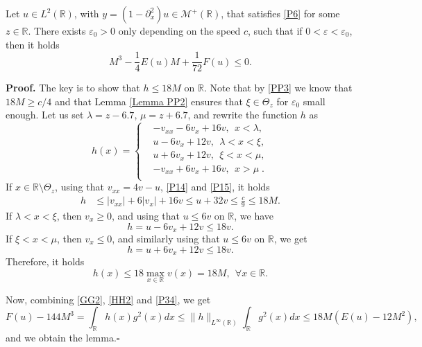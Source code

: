 \documentclass[10pt,a4paper,twoside]{article}
\begin{document}
\begin{Lem}\label{Lemma P6}
Let $u\in L^{2}(\mathbb{R})$, with  $y=(1-\partial^{2}_{x})u \in {\mathcal M}^+({\mathbb R})$, that satisfies  \eqref{P6} for some $z\in\mathbb{R}$. There exists $\varepsilon_{0}>0$ only depending on the speed $c$, such that if $0<\varepsilon<\varepsilon_{0}$, then it holds
\begin{equation}
M^{3}-\frac{1}{4}E(u)M+\frac{1}{72}F(u)\le 0.
\label{P33}
\end{equation}
\end{Lem}\noindent
\textbf{Proof.}
The key is to show that $h\le 18 M$ on $\mathbb{R}$. Note that by \eqref{PP3} we know that 
$18M\ge c/4$ and that Lemma \ref{Lemma PP2} ensures that  $ \xi \in \Theta_z $ for $\varepsilon_{0}$ small enough. Let us set $\lambda=z-6.7$, $\mu=z+6.7$, and rewrite the function $h$ as
\begin{equation*}
  h(x)=\left\{
    \begin{aligned}
     &-v_{xx}-6v_{x}+16v,~~x<\lambda,\\
     &u-6v_{x}+12v,~~\lambda<x<\xi,\\
     &u+6v_{x}+12v,~~\xi<x<\mu,\\
     &-v_{xx}+6v_{x}+16v,~~x>\mu  \; . \\
    \end{aligned}
  \right.
  \end{equation*}
If $x\in\mathbb{R}\setminus\Theta_z$, using that $v_{xx}=4v-u$, \eqref{P14} and \eqref{P15}, it holds 
\begin{align*}
h&\le|v_{xx}|+6|v_{x}|+16v\le u+32v\le\frac{c}{9}\le 18M.
\end{align*}
If $\lambda<x<\xi$, then $v_{x}\ge 0$, and using that $u\le 6v$ on $\mathbb{R}$, we have 
$$
h=u-6v_{x}+12v\le 18v.
$$
If $\xi<x<\mu$, then $v_{x}\le 0$, and similarly using that $u\le 6v$ on $\mathbb{R}$, we get 
$$
h=u+6v_{x}+12v\le 18v.
$$
Therefore, it holds 
\begin{equation}
h(x)\le 18\max_{x\in\mathbb{R}}v(x)=18M,~~\forall x\in\mathbb{R}.
\label{P34}
\end{equation}

Now, combining \eqref{GG2}, \eqref{HH2} and \eqref{P34}, we get 
$$
F(u)-144M^{3}=\int_{\mathbb{R}}h(x)g^{2}(x)dx
\le\|h\|_{L^{\infty}(\mathbb{R})}\int_{\mathbb{R}}g^{2}(x)dx
\le 18M(E(u)-12M^{2}),
$$
and we obtain the lemma.\hfill $ \square$ \vspace{2mm}
\end{document}
